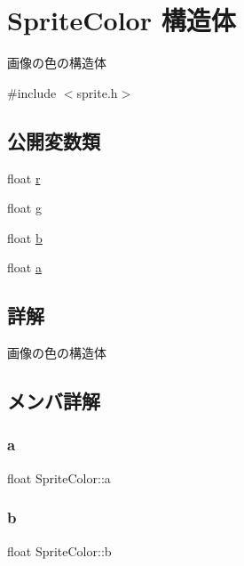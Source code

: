 \hypertarget{struct_sprite_color}{}\section{Sprite\+Color 構造体}
\label{struct_sprite_color}


画像の色の構造体  




{\ttfamily \#include $<$sprite.\+h$>$}

\subsection*{公開変数類}
\begin{DoxyCompactItemize}
\item 
float \mbox{\hyperlink{struct_sprite_color_a640d8864838a78db2a9d5f1840e24882}{r}}
\item 
float \mbox{\hyperlink{struct_sprite_color_ae59c4c99310c60ac72740f83a3073a44}{g}}
\item 
float \mbox{\hyperlink{struct_sprite_color_ae99d1e9c97a11bd8c3db47a0ee9d45c1}{b}}
\item 
float \mbox{\hyperlink{struct_sprite_color_a82a19f7f0f96f706b9c4715eb87e0de8}{a}}
\end{DoxyCompactItemize}


\subsection{詳解}
画像の色の構造体 

\subsection{メンバ詳解}
\mbox{\label{struct_sprite_color_a82a19f7f0f96f706b9c4715eb87e0de8}} 
\subsubsection{\texorpdfstring{a}{a}}
{\footnotesize\ttfamily float Sprite\+Color\+::a}

\mbox{\label{struct_sprite_color_ae99d1e9c97a11bd8c3db47a0ee9d45c1}} 
\subsubsection{\texorpdfstring{b}{b}}
{\footnotesize\ttfamily float Sprite\+Color\+::b}

